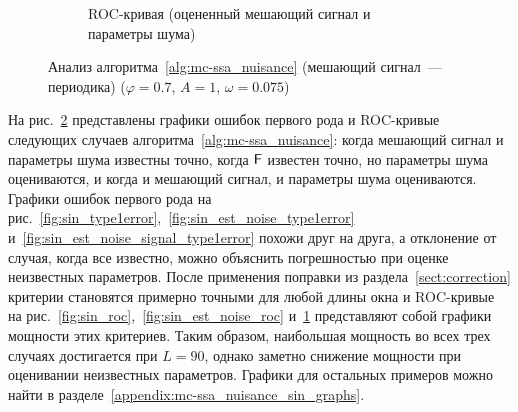 \documentclass[specialist,
substylefile = spbu_report.rtx,
subf,href,colorlinks=true, 12pt]{disser}
\theoremstyle{definition}
\begin{document}
\begin{figure}[h!]
\begin{subfigure}[t]{0.5\textwidth}
		\caption{ROC-кривая (оцененный мешающий сигнал и параметры шума)}
		\label{fig:sin_est_noise_signal_roc}
	\end{subfigure}
	
	
	\caption{Анализ алгоритма~\ref{alg:mc-ssa_nuisance} (мешающий сигнал~--- периодика) ($\varphi=0.7$, $A=1$, $\omega=0.075$)}
	\label{fig:sin}
\end{figure}

На рис.~\ref{fig:sin} представлены графики ошибок первого рода и ROC-кривые следующих случаев алгоритма~\ref{alg:mc-ssa_nuisance}: когда мешающий сигнал и параметры шума известны точно, когда $\mathsf{F}$ известен точно, но параметры шума оцениваются, и когда и мешающий сигнал, и параметры шума оцениваются. Графики ошибок первого рода на рис.~\ref{fig:sin_type1error},~\ref{fig:sin_est_noise_type1error} и~\ref{fig:sin_est_noise_signal_type1error} похожи друг на друга, а отклонение от случая, когда все известно, можно объяснить погрешностью при оценке неизвестных параметров. После применения поправки из раздела~\ref{sect:correction} критерии становятся примерно точными для любой длины окна и ROC-кривые на рис.~\ref{fig:sin_roc},~\ref{fig:sin_est_noise_roc} и~\ref{fig:sin_est_noise_signal_roc} представляют собой графики мощности этих критериев. Таким образом, наибольшая мощность во всех трех случаях достигается при $L=90$, однако заметно снижение мощности при оценивании неизвестных параметров. Графики для остальных примеров можно найти в разделе~\ref{appendix:mc-ssa_nuisance_sin_graphs}.

\end{document}
